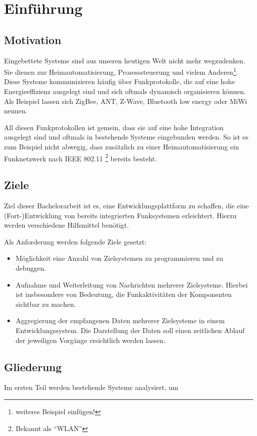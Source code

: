 \chapter{Einführung}
\section*{Motivation}
Eingebettete Systeme sind aus unseren heutigen Welt nicht mehr wegzudenken. Sie
dienen zur Heimautomatisierung, Prozesssteuerung und vielem
Anderen\footnote{weiteres Beispiel einfügen!}. Diese Systeme kommunizieren
häufig über Funkprotokolle, die auf eine hohe Energieeffizienz ausgelegt sind
und sich oftmals dynamisch organisieren können. Als Beispiel lassen sich ZigBee,
ANT, Z-Wave, Bluetooth low energy oder MiWi nennen.

All diesen Funkprotokollen ist gemein, dass sie auf eine hohe Integration
ausgelegt sind und oftmals in bestehende Systeme eingebunden werden. So ist es
zum Beispiel nicht abwegig, dass zusätzlich zu einer Heimautomatisierung ein
Funknetzwerk nach IEEE 802.11 \footnote{Bekannt als "`WLAN"'} bereits
besteht.

\cite*{sample_bib}
\section*{Ziele}
Ziel dieser Bachelorarbeit ist es, eine Entwicklungsplattform zu schaffen, die
eine (Fort-)Entwicklung von bereits integrierten Funksystemen erleichtert.
Hierzu werden verschiedene Hilfsmittel benötigt.

Als Anforderung werden folgende Ziele gesetzt:
\begin{itemize}
  \item Möglichkeit eine Anzahl von Zielsystemen zu programmieren und zu
  debuggen.
  \item Aufnahme und Weiterleitung von Nachrichten mehrerer Zielsysteme. Hierbei
  ist insbesondere von Bedeutung, die Funkaktivitäten der Komponenten sichtbar
  zu machen.
  \item Aggregierung der empfangenen Daten mehrerer Zielsysteme in einem
  Entwicklungssystem. Die Darstellung der Daten soll einen zeitlichen Ablauf
  der jeweiligen Vorgänge ersichtlich werden lassen.
\end{itemize}
\section*{Gliederung}
Im ersten Teil werden bestehende Systeme analysiert, um 
